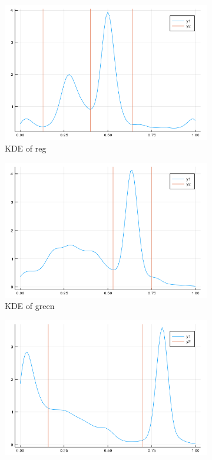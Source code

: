 \documentclass{article}
\begin{document}
\begin{figure}[htb]
  \centering
  \begin{subfigure}[b]{0.24\linewidth}
    \includegraphics[width=\linewidth]{images/kde_r.png}
    \caption{KDE of reg}
  \end{subfigure}
  \begin{subfigure}[b]{0.24\linewidth}
    \includegraphics[width=\linewidth]{images/kde_g.png}
    \caption{KDE of green}
  \end{subfigure}
  \begin{subfigure}[b]{0.24\linewidth}
    \includegraphics[width=\linewidth]{images/kde_b.png}

\end{subfigure}
\end{figure}
\end{document}
